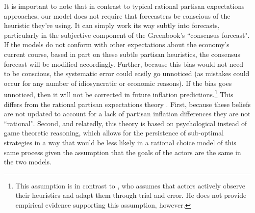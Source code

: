 \documentclass[a4paper]{article}
\begin{document}
It is important to note that in contrast to typical rational partisan expectations approaches, our model does not require that forecasters be conscious of the heuristic they're using. It can simply work its way subtly into forecasts, particularly in the subjective component of the Greenbook's ``consensus forecast". If the models do not conform with other expectations about the economy's current course, based in part on these subtle partisan heuristics, the consensus forecast will be modified accordingly. Further, because this bias would not need to be conscious, the systematic error could easily go unnoticed (as mistakes could occur for any number of idiosyncratic or economic reasons). If the bias goes unnoticed, then it will not be corrected in future inflation predictions.\footnote{This assumption is in contrast to \cite{Grauwe2011}, who assumes that actors actively observe their heuristics and adapt them through trial and error. He does not provide empirical evidence supporting this assumption, however.} This differs from the rational partisan expectations theory \cite[e.g.][]{Alesina1987,Alesina1991,Alesina1997,Hibbs1994}. First, because these beliefs are not updated to account for a lack of partisan inflation differences they are not ``rational". Second, and relatedly, this theory is based on psychological instead of game theoretic reasoning, which allows for the persistence of sub-optimal strategies in a way that would be less likely in a rational choice model of this same process given the assumption that the goals of the actors are the same in the two models.





\end{document}
